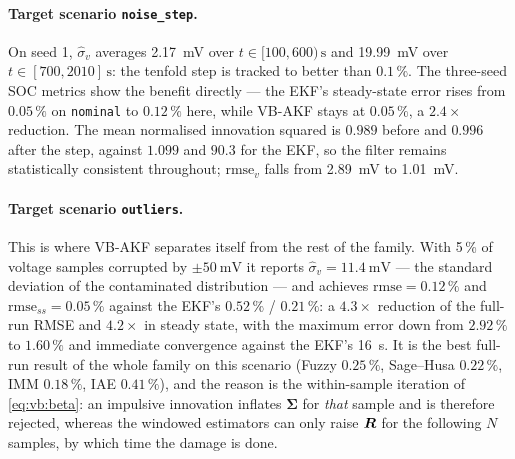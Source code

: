 \paragraph{Target scenario \texttt{noise\_step}.}  On seed 1, $\hat\sigma_v$ averages
\SI{2.17}{\milli\volt} over $t\in[100,600)\,\si{\second}$ and \SI{19.99}{\milli\volt} over
$t\in[700,2010]\,\si{\second}$: the tenfold step is tracked to better than $0.1\,\%$.  The three-seed
SOC metrics show the benefit directly --- the EKF's steady-state error rises from $0.05\,\%$ on
\texttt{nominal} to $0.12\,\%$ here, while VB-AKF stays at $\mathbf{0.05\,\%}$, a $2.4\times$
reduction.  The mean normalised innovation squared is $0.989$ before and $0.996$ after the step,
against $1.099$ and $\mathbf{90.3}$ for the EKF, so the filter remains statistically consistent
throughout; $\mathrm{rmse}_v$ falls from \SI{2.89}{\milli\volt} to \SI{1.01}{\milli\volt}.

\paragraph{Target scenario \texttt{outliers}.}  This is where VB-AKF separates itself from the rest of
the family.  With 5\,\% of voltage samples corrupted by $\pm\SI{50}{\milli\volt}$ it reports
$\hat\sigma_v=\SI{11.4}{\milli\volt}$ --- the standard deviation of the contaminated distribution ---
and achieves $\mathrm{rmse}=\mathbf{0.12\,\%}$ and $\mathrm{rmse}_{ss}=\mathbf{0.05\,\%}$ against the
EKF's $0.52\,\%$ / $0.21\,\%$: a $4.3\times$ reduction of the full-run RMSE and $4.2\times$ in steady
state, with the maximum error down from $2.92\,\%$ to $1.60\,\%$ and immediate convergence against the
EKF's \SI{16}{\second}.  It is the best full-run result of the whole family on this scenario
(Fuzzy $0.25\,\%$, Sage--Husa $0.22\,\%$, IMM $0.18\,\%$, IAE $0.41\,\%$), and the reason is the
within-sample iteration of \eqref{eq:vb:beta}: an impulsive innovation inflates $\bm\Sigma$ for
\emph{that} sample and is therefore rejected, whereas the windowed estimators can only raise $\bm{R}$
for the following $N$ samples, by which time the damage is done.

